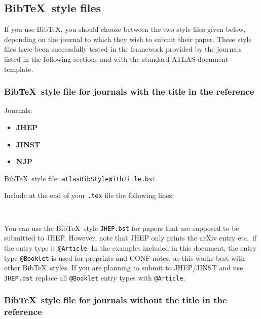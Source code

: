 \documentclass[UKenglish]{latex/atlasdoc}
\newcommand*{\BibTeX}{Bib\TeX}
\newcommand{\File}[1]{\texttt{#1}\xspace}
\newcommand{\Package}[1]{\texttt{#1}\xspace}
\begin{document}
\subsection{\BibTeX\ style files}

If you use \BibTeX, you should choose between the two style files given below, 
depending on the journal to which they wish to submit their paper.
These style files have been successfully tested in the framework provided by 
the journals listed in the following sections and with the standard ATLAS document template.


\subsubsection{\BibTeX\ style file for journals with the title in the reference}

Journals:
\begin{itemize}\setlength{\parskip}{0pt}\setlength{\itemsep}{0pt}
\item \textbf{JHEP}
\item \textbf{JINST}
\item \textbf{NJP}
\end{itemize}
%
\BibTeX\ style file: \Package{atlasBibStyleWithTitle.bst}

\noindent Include at the end of your \File{.tex} file the following lines:
\begin{verbatim}


\end{verbatim}

You can use the \BibTeX\ style \File{JHEP.bst} for papers that are supposed to be submitted to JHEP.
However, note that JHEP only prints the arXiv entry etc.\ if the entry type is \texttt{@Article}.
In the examples included in this document,
the entry type \texttt{@Booklet} is used for preprints and CONF notes,
as this works best with other \BibTeX\ styles.
If you are planning to submit to JHEP/JINST and use \File{JHEP.bst} 
replace all \texttt{@Booklet} entry types with \texttt{@Article}.


\subsubsection{\BibTeX\ style file for journals without the title in the reference}
\end{document}
